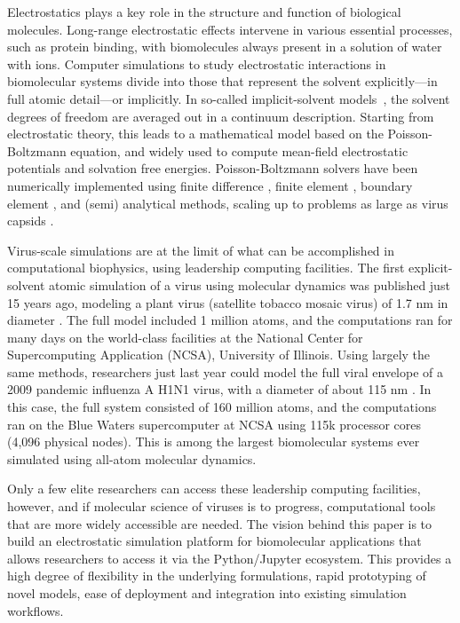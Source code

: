 Electrostatics plays a key role in the structure and function of biological molecules.
Long-range electrostatic effects intervene in various essential processes, such as protein binding, with biomolecules always present in a solution of water with ions.
Computer simulations to study electrostatic interactions in biomolecular systems divide into those that represent the solvent explicitly---in full atomic detail---or implicitly.
In so-called implicit-solvent models~\cite{RouxSimonson1999,DecherchiETal2015}, the solvent degrees of freedom are averaged out in a continuum description.
Starting from electrostatic theory, this leads to a mathematical model based on the Poisson-Boltzmann equation, and widely used to compute mean-field electrostatic potentials and solvation free energies.
Poisson-Boltzmann solvers have been numerically implemented using finite difference \cite{RocchiaAlexovHonig2001, BakerETal2001}, finite element \cite{BakerETal2001,BondETal2010,HolstETal2012}, boundary element \cite{AltmanBardhanWhiteTidor2009, GengKrasny2013, ZhangPengHuangPitsianisSunLu2015, CooperBardhanBarba2014}, and (semi) analytical \cite{LotanHead-Gordon2006,FelbergETal2017} methods, scaling up to problems as large as virus capsids \cite{ZhangETal2019,MartinezETal2019}.

Virus-scale simulations are at the limit of what can be accomplished in computational biophysics, using leadership computing facilities.
The first explicit-solvent atomic simulation of a virus using molecular dynamics was published just 15 years ago, modeling a plant virus (satellite tobacco mosaic virus) of 1.7 nm in diameter \cite{FreddolinoETal2006}.
The full model included 1 million atoms, and the computations ran for many days on the world-class facilities at the National Center for Supercomputing Application (NCSA), University of Illinois.
Using largely the same methods, researchers just last year could model the full viral envelope of a 2009 pandemic influenza A H1N1 virus, with a diameter of about 115 nm \cite{DurrantETal2020}.
In this case, the full system consisted of 160 million atoms, and the computations ran on the Blue Waters supercomputer at NCSA using 115k processor cores (4,096 physical nodes).
This is among the largest biomolecular systems ever simulated using all-atom molecular dynamics.

Only a few elite researchers can access these leadership computing facilities, however, and if molecular science of viruses is to progress, computational tools that are more widely accessible are needed.
The vision behind this paper is to build an electrostatic simulation platform for biomolecular applications that allows researchers to access it via the Python/Jupyter ecosystem. This provides a high degree of flexibility in the underlying formulations, rapid prototyping of novel models, ease of deployment and integration into existing simulation workflows.


